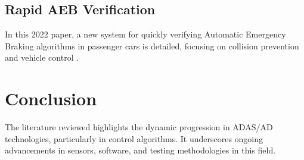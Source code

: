 \documentclass[12pt]{report}
\begin{document}
\section{Rapid AEB Verification}
In this 2022 paper, a new system for quickly verifying Automatic Emergency Braking algorithms in passenger cars is detailed, focusing on collision prevention and vehicle control \citep{aebVerification2024}.

\chapter{Conclusion}
The literature reviewed highlights the dynamic progression in ADAS/AD technologies, particularly in control algorithms. It underscores ongoing advancements in sensors, software, and testing methodologies in this field.

\newpage

\end{document}
